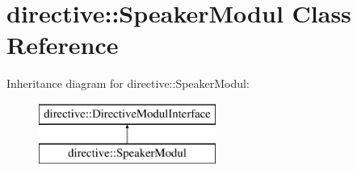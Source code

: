 \hypertarget{classdirective_1_1SpeakerModul}{}\section{directive\+:\+:Speaker\+Modul Class Reference}
\label{classdirective_1_1SpeakerModul}
Inheritance diagram for directive\+:\+:Speaker\+Modul\+:\begin{figure}[H]
\begin{center}
\leavevmode
\includegraphics[height=2.000000cm]{d6/d01/classdirective_1_1SpeakerModul}
\end{center}
\end{figure}
